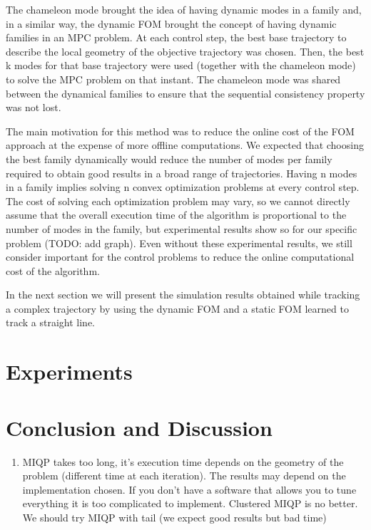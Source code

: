 \documentclass[12,twoside]{TFG-GM}
\theoremstyle{definition}
\theoremstyle{remark}
\begin{document}
The chameleon mode brought the idea of having dynamic modes in a family and, in a similar way, the dynamic FOM brought the concept of having dynamic families in an MPC problem. At each control step, the best base trajectory to describe the local geometry of the objective trajectory was chosen. Then, the best k modes for that base trajectory were used (together with the chameleon mode) to solve the MPC problem on that instant. The chameleon mode was shared between the dynamical families to ensure that the sequential consistency property was not lost.

The main motivation for this method was to reduce the online cost of the FOM approach at the expense of more offline computations. We expected that choosing the best family dynamically would reduce the number of modes per family required to obtain good results in a broad range of trajectories. Having n modes in a family implies solving n convex optimization problems at every control step. The cost of solving each optimization problem may vary, so we cannot directly assume that the overall execution time of the algorithm is proportional to the number of modes in the family, but experimental results show so for our specific problem (TODO: add graph). Even without these experimental results, we still consider important for the control problems to reduce the online computational cost of the algorithm.

In the next section we will present the simulation results obtained while tracking a complex trajectory by using the dynamic FOM and a static FOM learned to track a straight line.

\section{Experiments}
\label{sec:experiments}

\section{Conclusion and Discussion}
\label{sec:conclusion}
\begin{enumerate}
\item{MIQP} takes too long, it's execution time depends on the geometry of the problem (different time at each iteration). The results may depend on the implementation chosen. If you don't have a software that allows you to tune everything it is too complicated to implement. Clustered MIQP is no better. We should try MIQP with tail (we expect good results but bad time)
\end{enumerate}
\end{document}
